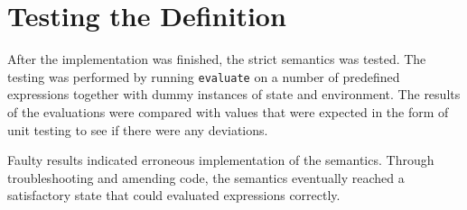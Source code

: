 \section{Testing the Definition}

After the implementation was finished, the strict semantics was tested.
The testing was performed by running \texttt{evaluate} on a number of predefined
expressions together with dummy instances of state and environment.
The results of the evaluations were compared with values that were expected
in the form of unit testing to see if there were any deviations. 

Faulty results indicated erroneous implementation of the semantics.
Through troubleshooting and amending code, the semantics eventually
reached a satisfactory state that could evaluated expressions correctly.


